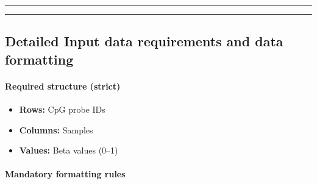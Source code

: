 \documentclass[
]{article}
\providecommand{\tightlist}{%
  \setlength{\itemsep}{0pt}\setlength{\parskip}{0pt}}
\begin{document}
\begin{center}\rule{0.5\linewidth}{0.5pt}\end{center}

\begin{center}\rule{0.5\linewidth}{0.5pt}\end{center}

\subsection{Detailed Input data requirements and data
formatting}\label{detailed-input-data-requirements-and-data-formatting}

\paragraph{Required structure (strict)}\label{required-structure-strict}

\begin{itemize}
\tightlist
\item
  \textbf{Rows:} CpG probe IDs\\
\item
  \textbf{Columns:} Samples\\
\item
  \textbf{Values:} Beta values (0--1)
\end{itemize}

\paragraph{Mandatory formatting rules}\label{mandatory-formatting-rules}
\end{document}
